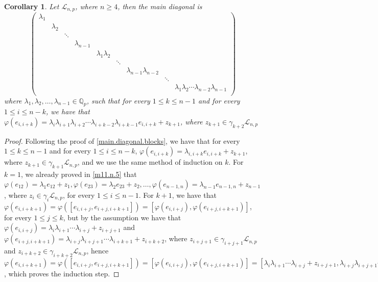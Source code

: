 \documentclass[12pt,fleqn]{article}
\newtheorem{corollary}[theorem]{Corollary}
\begin{document}
\begin{corollary}
Let $\mathcal{L}_{n,p}$, where $n\geq 4$, then the main diagonal is
\[\begin{pmatrix}
\lambda_1 \\
& \lambda_2  \\
& & \ddots\\
& & & \lambda_{n-1}\\
& & & &\lambda_1\lambda_2\\
& & & & &\ddots\\
& & & & & &\lambda_{n-1}\lambda_{n-2}\\
& & & & & & &\ddots\\
& & & & & & & &\lambda_1\lambda_2\cdots\lambda_{n-2}\lambda_{n-1}\\
\end{pmatrix}\]
where $\lambda_1,\lambda_2,\dots,\lambda_{n-1}\in\mathbb{Q}_p$, such that for every $1\leq k\leq n-1$ and for every $1\leq i\leq n-k$, we have that $\varphi(e_{i,i+k})=\lambda_i\lambda_{i+1}\lambda_{i+2}\cdots\lambda_{i+k-2}\lambda_{i+k-1}e_{i,i+k}+z_{k+1}$, where $z_{k+1}\in\gamma_{k+2}\mathcal{L}_{n,p}$
\end{corollary}
\begin{proof}
Following the proof of \ref{main.diagonal.blocks}, we have that for every $1\leq k\leq n-1$ and for every $1\leq i\leq n-k$, $\varphi(e_{i,i+k})=\lambda_{i,i+k}e_{i,i+k}+z_{k+1}$, where $z_{k+1}\in\gamma_{k+1}\mathcal{L}_{n,p}$, and we use the same method of induction on $k$. For $k=1$, we already proved in \ref{m11.n.5} that $\varphi(e_{12})=\lambda_1 e_{12}+z_1,\varphi(e_{23})=\lambda_2 e_{23}+z_2,\dots,\varphi(e_{n-1,n})=\lambda_{n-1}e_{n-1,n}+z_{n-1}$, where $z_i\in\gamma_i\mathcal{L}_{n,p}$, for every $1\leq i\leq n-1$. For $k+1$, we have that $\varphi(e_{i,i+k+1})=\varphi([e_{i,i+j},e_{i+j,i+k+1}])=[\varphi(e_{i,i+j}),\varphi(e_{i+j,i+k+1})]$, for every $1\leq j\leq k$, but by the assumption we have that $\varphi(e_{i,i+j})=\lambda_i\lambda_{i+1}\cdots\lambda_{i+j}+z_{i+j+1}$ and $\varphi(e_{i+j,i+k+1})=\lambda_{i+j}\lambda_{i+j+1}\cdots\lambda_{i+k+1}+z_{i+k+2}$, where $z_{i+j+1}\in\gamma_{i+j+1}\mathcal{L}_{n,p}$ and $z_{i+k+2}\in\gamma_{i+k+2}\mathcal{L}_{n,p}$, hence $\varphi(e_{i,i+k+1})=\varphi([e_{i,i+j},e_{i+j,i+k+1}])=[\varphi(e_{i,i+j}),\varphi(e_{i+j,i+k+1})]=[\lambda_i\lambda_{i+1}\cdots\lambda_{i+j}+z_{i+j+1},\lambda_{i+j}\lambda_{i+j+1}\cdots\lambda_{i+k+1}+z_{i+k+2}]=\lambda_i\lambda_{i+1}\lambda_{i+2}\lambda_{i+k}\cdots\lambda_{i+k+1}+z_{i+k+2}$, which proves the induction step.
\end{proof}
\end{document}
